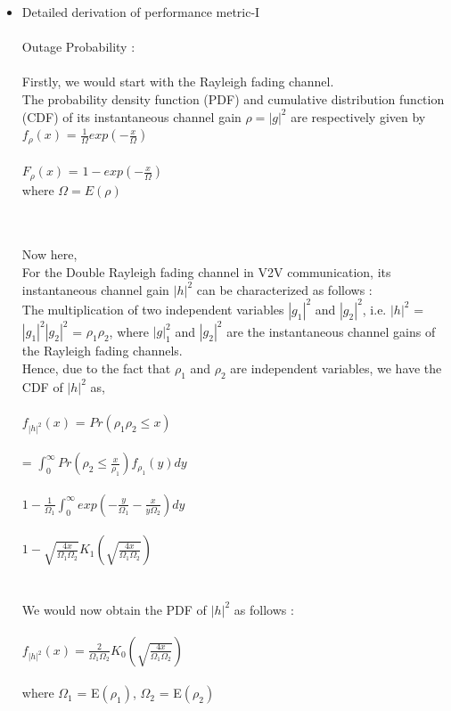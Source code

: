 \documentclass{article}
\begin{document}
\begin{itemize}
\begin{center}
\begin{figure}[h!]
    \label{fig:}
\end{figure}
\end{center}





\item Detailed derivation of performance metric-I
\\\\Outage Probability :
\\\\Firstly, we would start with the Rayleigh fading channel.
\\The probability density function (PDF) and cumulative distribution function
(CDF) of its instantaneous channel gain $\rho = |g|^{2}$ are respectively
given by $f_{\rho}(x)$ = $\frac{1}{\Omega} exp (-\frac{x}{\Omega})$
\\\\$F_{\rho}(x)$ = $1 - exp (-\frac{x}{\Omega})$
\\where $\Omega = E(\rho)$

\\\\Now here,
\\For the Double Rayleigh fading channel in V2V communication, its instantaneous channel gain $|h|^{2}$ can be characterized as follows :
\\The multiplication of two independent variables $|g_{1}|^{2}$ and $|g_{2}|^{2}$, i.e. $|h|^{2}$ = $|g_{1}|^{2} |g_{2}|^{2}$ = $\rho_{1}\rho_{2}$, where $|g|_{1}^{2}$ and $|g_{2}|^{2}$ are the instantaneous channel gains of the Rayleigh fading channels.
\\Hence, due to the fact that $\rho_{1}$ and $\rho_{2}$ are independent variables, we have the CDF of $|h|^{2}$ as,
\\\\$f_{|h|^{2}}(x)$ = $Pr(\rho_{1}\rho_{2}\leq x)$
\\\\ = $\int_{0}^{\infty} Pr(\rho_{2}\leq \frac{x}{\rho_{1}})f_{\rho_{1}}(y)dy$
\\\\$1 - \frac{1}{\Omega_{1}} \int_{0}^{\infty} exp(-\frac{y}{\Omega_{1}}-\frac{x}{y\Omega_{2}})dy$
\\\\$1 - \sqrt{\frac{4x}{\Omega_{1}\Omega_{2}}}K_{1}(\sqrt{\frac{4x}{\Omega_{1}\Omega_{2}}})$\\

\\\\We would now obtain the PDF of $|h|^{2}$ as follows :
\\\\$f_{|h|^{2}}(x) = \frac{2}{\Omega_{1}\Omega_{2}}K_{0}(\sqrt{\frac{4x}{\Omega_{1}\Omega_{2}}})$
\\\\where $\Omega_{1}$ = E$(\rho_{1})$, $\Omega_{2}$ = E$(\rho_{2})$


\end{itemize}
\end{document}
